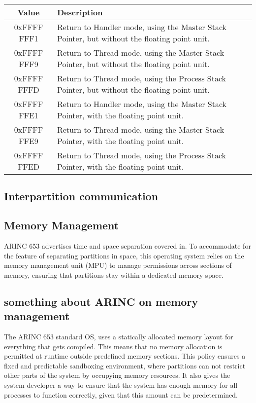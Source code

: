 \begin{table}[H]

	\centering
	\begin{tabular}{|c|p{10cm}|}
		\hline
		Value			&	Description 	\\
		\hline
		0xFFFF FFF1 	&	Return to Handler mode, using the Master Stack Pointer, but without the floating point unit.	\\
		\hline
		0xFFFF FFF9		&	Return to Thread mode, using the Master Stack Pointer, but without the floating point unit.		\\
		\hline
		0xFFFF FFFD		&	Return to Thread mode, using the Process Stack Pointer, but without the floating point unit.	\\
		\hline
		0xFFFF FFE1		&	Return to Handler mode, using the Master Stack Pointer, with the floating point unit.			\\
		\hline
		0xFFFF FFE9		&	Return to Thread mode, using the Master Stack Pointer, with the floating point unit.			\\
		\hline
		0xFFFF FFED		&	Return to Thread mode, using the Process Stack Pointer, with the floating point unit.			\\
		\hline
	\end{tabular}
	\label{tab:exc-return}
\end{table}

\subsection{Interpartition communication}


\subsection{Memory Management}
ARINC 653 advertises time and space separation covered in.
To accommodate for the feature of separating partitions in space,
this operating system relies on the memory management unit (MPU)
to manage permissions across sections of memory,
ensuring that partitions stay within a dedicated memory space.

\subsection{something about ARINC on memory management}
The ARINC 653 standard OS, uses a statically allocated memory layout for everything
that gets compiled.
This means that no memory allocation is permitted at runtime
outside predefined memory sections.
This policy ensures a fixed and predictable sandboxing environment, where partitions
can not restrict other parts of the system by occupying memory resources.
It also gives the system developer a way to ensure that the system has enough memory
for all processes to function correctly, given that this amount can be predetermined.

